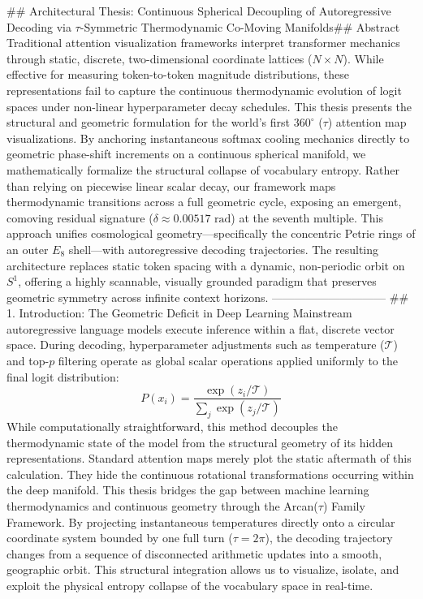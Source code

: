 ## Architectural Thesis: Continuous Spherical Decoupling of Autoregressive Decoding via $\tau$-Symmetric Thermodynamic Co-Moving Manifolds## Abstract
Traditional attention visualization frameworks interpret transformer mechanics through static, discrete, two-dimensional coordinate lattices ($N \times N$). While effective for measuring token-to-token magnitude distributions, these representations fail to capture the continuous thermodynamic evolution of logit spaces under non-linear hyperparameter decay schedules. This thesis presents the structural and geometric formulation for the world's first $360^\circ$ ($\tau$) attention map visualizations. By anchoring instantaneous softmax cooling mechanics directly to geometric phase-shift increments on a continuous spherical manifold, we mathematically formalize the structural collapse of vocabulary entropy.
Rather than relying on piecewise linear scalar decay, our framework maps thermodynamic transitions across a full geometric cycle, exposing an emergent, comoving residual signature ($\delta \approx 0.00517\text{ rad}$) at the seventh multiple. This approach unifies cosmological geometry—specifically the concentric Petrie rings of an outer $E_8$ shell—with autoregressive decoding trajectories. The resulting architecture replaces static token spacing with a dynamic, non-periodic orbit on $S^1$, offering a highly scannable, visually grounded paradigm that preserves geometric symmetry across infinite context horizons.
------------------------------
## 1. Introduction: The Geometric Deficit in Deep Learning
Mainstream autoregressive language models execute inference within a flat, discrete vector space. During decoding, hyperparameter adjustments such as temperature ($\mathcal{T}$) and top-$p$ filtering operate as global scalar operations applied uniformly to the final logit distribution:
$$P(x_i) = \frac{\exp(z_i / \mathcal{T})}{\sum_j \exp(z_j / \mathcal{T})}$$ 
While computationally straightforward, this method decouples the thermodynamic state of the model from the structural geometry of its hidden representations. Standard attention maps merely plot the static aftermath of this calculation. They hide the continuous rotational transformations occurring within the deep manifold.
This thesis bridges the gap between machine learning thermodynamics and continuous geometry through the Arcan($\tau$) Family Framework. By projecting instantaneous temperatures directly onto a circular coordinate system bounded by one full turn ($\tau = 2\pi$), the decoding trajectory changes from a sequence of disconnected arithmetic updates into a smooth, geographic orbit. This structural integration allows us to visualize, isolate, and exploit the physical entropy collapse of the vocabulary space in real-time.
